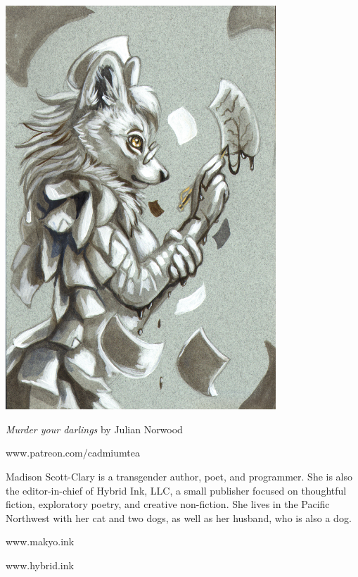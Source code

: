 \begin{paracol}{2}
\begin{leftcolumn}
\includegraphics[width=4in]{assets/cadmiumtea--MurderYourDarlings--makyo--G.jpg}

\emph{Murder your darlings} by Julian Norwood

www.patreon.com/cadmiumtea
\end{leftcolumn}
\begin{rightcolumn}
    \null
    \vfill
\noindent Madison Scott-Clary is a transgender author, poet, and programmer. She is also the editor-in-chief of Hybrid Ink, LLC, a small publisher focused on thoughtful fiction, exploratory poetry, and creative non-fiction. She lives in the Pacific Northwest with her cat and two dogs, as well as her husband, who is also a dog.


\begin{center}
    www.makyo.ink

    www.hybrid.ink
\end{center}
\vfill
\end{rightcolumn}
\end{paracol}
